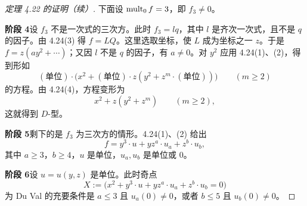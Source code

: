 \begin{proof}[定理 4.22 的证明（续）]
下面设 $\operatorname{mult}_0f=3$，即 $f_3\ne 0$。

\noindent\textbf{阶段 4}\quad 设 $f_3$ 不是一次式的三次方。此时 $f_3=lq$，其中 $l$ 是齐次一次式，且不是 $q$ 的因子。由 4.24(3) 得 $f=LQ$。这里选取坐标，使 $L$ 成为坐标之一 $z$。于是 $f=z(ay^2+\cdots)$；又因 $l$ 不是 $q$ 的因子，有 $a\ne 0$。对 $y^2$ 应用 4.24(1)、(2)，得到形如
\[
(\text{单位})\cdot\bigl(x^2+(\text{单位})\cdot z(y^2+z^m\cdot(\text{单位}))\bigr)\qquad(m\ge 2)
\]
的方程。由 4.24(4)，方程变形为
\[
x^2+z(y^2+z^m)\qquad(m\ge 2),
\]
这就得到 $D$-型。

\noindent\textbf{阶段 5}\quad 剩下的是 $f_3$ 为三次方的情形。4.24(1)、(2) 给出
\[
f=y^3\cdot u+yz^a\cdot u_a+z^b\cdot u_b ,
\]
其中 $a\ge 3$，$b\ge 4$，$u$ 是单位，$u_a,u_b$ 是单位或 $0$。

\noindent\textbf{阶段 6}\quad 设 $u=u(y,z)$ 是单位。此时奇点
\[
X:=\bigl(x^2+y^3\cdot u+yz^a\cdot u_a+z^b\cdot u_b=0\bigr)
\]
为 Du Val 的充要条件是 $a\le 3$ 且 $u_a(0)\ne 0$，或者 $b\le 5$ 且 $u_b(0)\ne 0$。
\end{proof}


